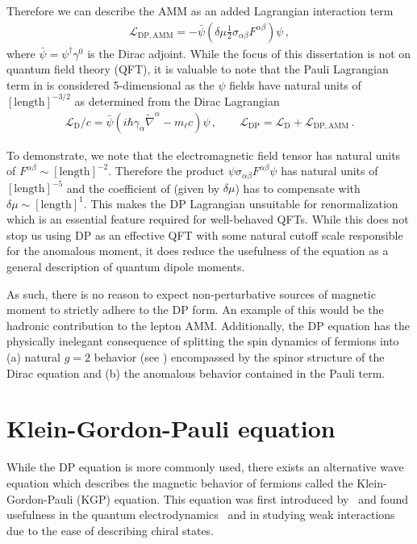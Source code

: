 Therefore we can describe the AMM as an added Lagrangian interaction term
\begin{gather}
    \label{lamm:1}
    \mathcal{L}_\mathrm{DP,AMM} = -{\bar\psi}\left(\delta\mu\frac{1}{2}\sigma_{\alpha\beta}F^{\alpha\beta}\right)\psi\,,
\end{gather}
where ${\bar\psi}=\psi^{\dagger}\gamma^{0}$ is the Dirac adjoint. While the focus of this dissertation is not on quantum field theory (QFT), it is valuable to note that the Pauli Lagrangian term in  is considered 5-dimensional as the $\psi$ fields have natural units of $[\mathrm{length}]^{-3/2}$ as determined from the Dirac Lagrangian
\begin{gather}
    \label{ld:1}
    \mathcal{L}_\mathrm{D}/c=\bar\psi\left(i\hbar\gamma_{\alpha}\widetilde\nabla^{\alpha}-m_{\ell}c\right)\psi\,,\qquad \mathcal{L}_\mathrm{DP} = \mathcal{L}_\mathrm{D} + \mathcal{L}_\mathrm{DP,AMM}\,.
\end{gather}

To demonstrate, we note that the electromagnetic field tensor has natural units of $F^{\alpha\beta}\sim[\mathrm{length}]^{-2}$. Therefore the product $\psi\sigma_{\alpha\beta}F^{\alpha\beta}\psi$ has natural units of $[\mathrm{length}]^{-5}$ and the coefficient of  (given by $\delta\mu$) has to compensate with $\delta\mu\sim[\mathrm{length}]^{1}$. This makes the DP Lagrangian unsuitable for renormalization which is an essential feature required for well-behaved QFTs. While this does not stop us using DP as an effective QFT with some natural cutoff scale responsible for the anomalous moment, it does reduce the usefulness of the equation as a general description of quantum dipole moments.

As such, there is no reason to expect non-perturbative sources of magnetic moment to strictly adhere to the DP form. An example of this would be the hadronic contribution to the lepton AMM. Additionally, the DP equation has the physically inelegant consequence of splitting the spin dynamics of fermions into (a) natural $g\!=\!2$ behavior (see ) encompassed by the spinor structure of the Dirac equation and (b) the anomalous behavior contained in the Pauli term.

\section{Klein-Gordon-Pauli equation}
\label{sec:kgp}
\noindent While the DP equation is more commonly used, there exists an alternative wave equation which describes the magnetic behavior of fermions called the Klein-Gordon-Pauli (KGP) equation. This equation was first introduced by~\cite{Fock:1937dy} and found usefulness in the quantum electrodynamics~\citep{Feynman:1951gn} and in studying weak interactions~\citep{Feynman:1958ty} due to the ease of describing chiral states.

